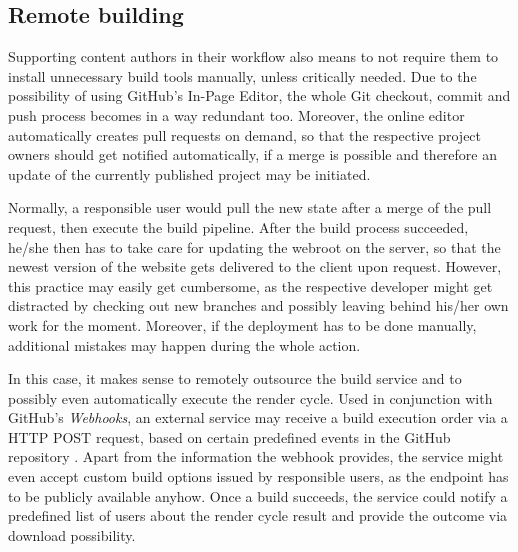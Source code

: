 \subsection{Remote building}
\label{sec:solutions-remotebuilding}

Supporting content authors in their workflow also means to not require them to install unnecessary build tools manually, unless critically needed. Due to the possibility of using GitHub's In-Page Editor, the whole Git checkout, commit and push process becomes in a way redundant too. Moreover, the online editor automatically creates pull requests on demand, so that the respective project owners should get notified automatically, if a merge is possible and therefore an update of the currently published project may be initiated.

Normally, a responsible user would pull the new state after a merge of the pull request, then execute the build pipeline. After the build process succeeded, he/she then has to take care for updating the webroot on the server, so that the newest version of the website gets delivered to the client upon request. However, this practice may easily get cumbersome, as the respective developer might get distracted by checking out new branches and possibly leaving behind his/her own work for the moment. Moreover, if the deployment has to be done manually, additional mistakes may happen during the whole action.

In this case, it makes sense to remotely outsource the build service and to possibly even automatically execute the render cycle. Used in conjunction with GitHub's \emph{Webhooks}, an external service may receive a build execution order via a HTTP POST request, based on certain predefined events in the GitHub repository \cite{GithubWebhooks}. Apart from the information the webhook provides, the service might even accept custom build options issued by responsible users, as the endpoint has to be publicly available anyhow. Once a build succeeds, the service could notify a predefined list of users about the render cycle result and provide the outcome via download possibility.

